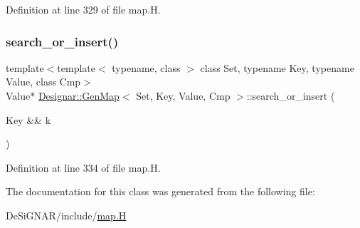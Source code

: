 Definition at line 329 of file map.\+H.

\mbox{\label{class_designar_1_1_gen_map_ae2ab69b26f782abcd99f99944253d8de}} 
\subsubsection{\texorpdfstring{search\+\_\+or\+\_\+insert()}{search\_or\_insert()}\hspace{0.1cm}{\footnotesize\ttfamily [6/6]}}
{\footnotesize\ttfamily template$<$template$<$ typename, class $>$ class Set, typename Key, typename Value, class Cmp$>$ \\
Value$\ast$ \hyperlink{class_designar_1_1_gen_map}{Designar\+::\+Gen\+Map}$<$ Set, Key, Value, Cmp $>$\+::search\+\_\+or\+\_\+insert (\begin{DoxyParamCaption}\item[{Key \&\&}]{k }\end{DoxyParamCaption})\hspace{0.3cm}{\ttfamily [inline]}}



Definition at line 334 of file map.\+H.



The documentation for this class was generated from the following file\+:\begin{DoxyCompactItemize}
\item 
De\+Si\+G\+N\+A\+R/include/\hyperlink{map_8_h}{map.\+H}\end{DoxyCompactItemize}
